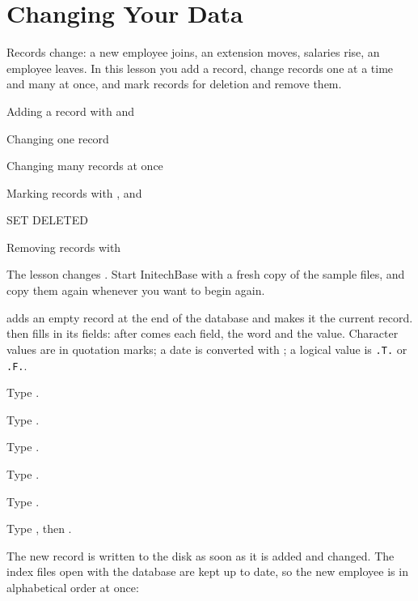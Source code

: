 \chapter{Changing Your Data}
Records change: a new employee joins, an extension moves, salaries rise, an
employee leaves.  In this lesson you add a record, change records one at a time
and many at once, and mark records for deletion and remove them.

\begin{ChapterCovers}
\item Adding a record with  and 
\item Changing one record
\item Changing many records at once
\item Marking records with , and 
\item SET DELETED
\item Removing records with 
\end{ChapterCovers}

The lesson changes .  Start InitechBase with a fresh copy of the
sample files, and copy them again whenever you want to begin again.

 adds an empty record at the end of the database and makes it
the current record.   then fills in its fields: after
 comes each field, the word  and the value.  Character
values are in quotation marks; a date is converted with ; a logical
value is \texttt{.T.} or \texttt{.F.}.
\begin{Steps}
\item Type .
\item Type .
\item Type .
\item Type .
\item Type .
\item Type , then
.
\end{Steps}
The new record is written to the disk as soon as it is added and changed.  The
index files open with the database are kept up to date, so the new employee is
in alphabetical order at once:

